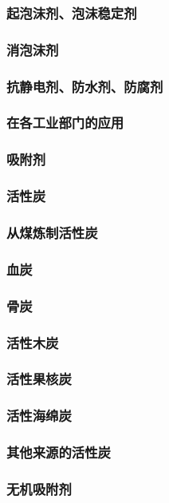 \documentclass[UTF8]{../../ApplicationUniverse}
\begin{document}
        \subsubsection{起泡沫剂、泡沫稳定剂}
        \subsubsection{消泡沫剂}
        \subsubsection{抗静电剂、防水剂、防腐剂}
        \subsubsection{在各工业部门的应用}
\subsubsection{吸附剂}
    \subsubsection{活性炭}
        \subsubsection{从煤炼制活性炭}
        \subsubsection{血炭}
        \subsubsection{骨炭}
        \subsubsection{活性木炭}
        \subsubsection{活性果核炭}
        \subsubsection{活性海绵炭}
        \subsubsection{其他来源的活性炭}
    \subsubsection{无机吸附剂}
\end{document}
